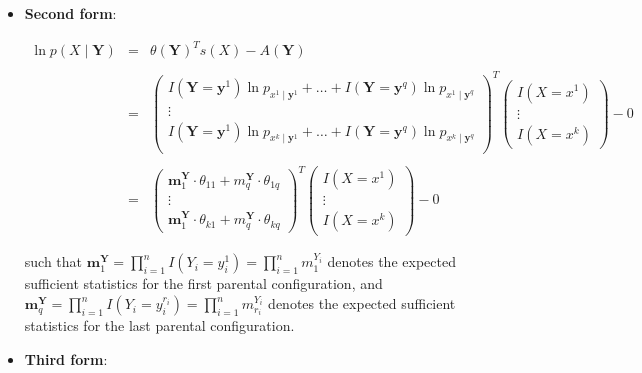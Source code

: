 \documentclass[11pt, oneside]{article}   	%
\numberwithin{figure}{section}
\numberwithin{equation}{section}
\numberwithin{table}{section}
\begin{document}
\begin{itemize}
\vspace{0.5in}
\item \textbf{Second form}:

\begin{eqnarray*}
\ln p(X \mid \mathbf{Y}) &=& \theta(\mathbf{Y})^Ts(X) - A(\mathbf{Y}) \\ \\
&=&
\begin{pmatrix}
I(\mathbf{Y}=\mathbf{y}^1) \ln p_{x^1\mid \mathbf{y}^1} + \ldots + I(\mathbf{Y}=\mathbf{y}^q)\ln p_{x^1\mid \mathbf{y}^q}\\
\vdots \\
I(\mathbf{Y}=\mathbf{y}^1) \ln p_{x^k\mid \mathbf{y}^1} + \ldots + I(\mathbf{Y}=\mathbf{y}^q)\ln p_{x^k\mid \mathbf{y}^q}\\
\end{pmatrix}^T
\begin{pmatrix}
I(X=x^1) \\
\vdots \\
I(X=x^k) 
\end{pmatrix}
- 0 \\ \\
&=&
\begin{pmatrix}
\mathbf{m}^{\mathbf{Y}}_1 \cdot \theta_{11}  + m^{\mathbf{Y}}_q \cdot \theta_{1q} \\
\vdots \\
\mathbf{m}^{\mathbf{Y}}_1 \cdot \theta_{k1}  + m^{\mathbf{Y}}_q \cdot \theta_{kq}
\end{pmatrix}^T
\begin{pmatrix}
I(X=x^1) \\
\vdots \\
I(X=x^k)
\end{pmatrix}
- 0 
\end{eqnarray*}

\noindent such that $\mathbf{m}^{\mathbf{Y}}_1 = \prod_{i=1}^n I( Y_i = y_i^1) = \prod_{i=1}^n m^{Y_i}_1$ denotes the expected sufficient statistics for the first parental configuration, and $\mathbf{m}^{\mathbf{Y}}_q = \prod_{i=1}^n I( Y_i = y_i^{r_i})  = \prod_{i=1}^n m^{Y_i}_{r_i} $ denotes the expected sufficient statistics for the last parental configuration.

\vspace{0.5in}
\item \textbf{Third form}:


\end{itemize}
\end{document}
